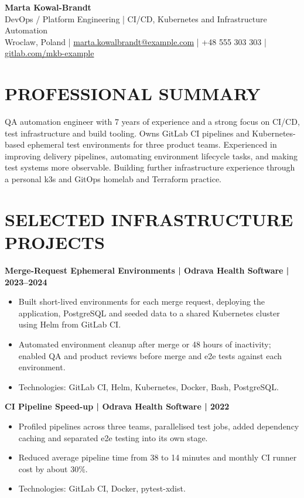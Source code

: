 \documentclass[11pt,a4paper]{article}
\begin{document}
\begin{center}
{\LARGE\bfseries Marta Kowal-Brandt}\\[0.25em]
{\large DevOps / Platform Engineering | CI/CD, Kubernetes and Infrastructure Automation}\\[0.25em]
Wroclaw, Poland | \href{mailto:marta.kowalbrandt@example.com}{marta.kowalbrandt@example.com} | +48 555 303 303 | \href{https://gitlab.com/mkb-example}{gitlab.com/mkb-example}
\end{center}

\section*{PROFESSIONAL SUMMARY}
QA automation engineer with 7 years of experience and a strong focus on CI/CD, test infrastructure and build tooling. Owns GitLab CI pipelines and Kubernetes-based ephemeral test environments for three product teams. Experienced in improving delivery pipelines, automating environment lifecycle tasks, and making test systems more observable. Building further infrastructure experience through a personal k3s and GitOps homelab and Terraform practice.

\section*{SELECTED INFRASTRUCTURE PROJECTS}
\textbf{Merge-Request Ephemeral Environments | Odrava Health Software | 2023–2024}
\begin{itemize}
\item Built short-lived environments for each merge request, deploying the application, PostgreSQL and seeded data to a shared Kubernetes cluster using Helm from GitLab CI.
\item Automated environment cleanup after merge or 48 hours of inactivity; enabled QA and product reviews before merge and e2e tests against each environment.
\item Technologies: GitLab CI, Helm, Kubernetes, Docker, Bash, PostgreSQL.
\end{itemize}

\textbf{CI Pipeline Speed-up | Odrava Health Software | 2022}
\begin{itemize}
\item Profiled pipelines across three teams, parallelised test jobs, added dependency caching and separated e2e testing into its own stage.
\item Reduced average pipeline time from 38 to 14 minutes and monthly CI runner cost by about 30\%.
\item Technologies: GitLab CI, Docker, pytest-xdist.
\end{itemize}
\end{document}
